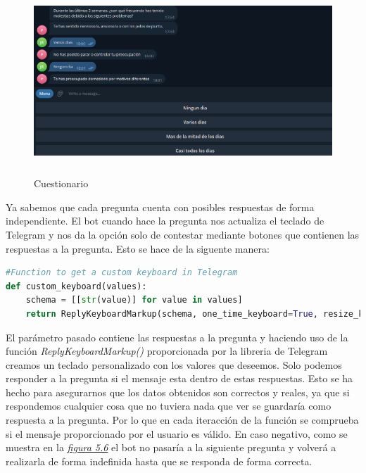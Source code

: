 \begin{figure}[!ht]
    \centering
    \includegraphics[width=1\textwidth, height=7cm]{imagenes/question.png}
    \caption{ Cuestionario }
    \label{fig:cuestionario}
\end{figure}

Ya sabemos que cada pregunta cuenta con posibles respuestas de forma independiente. El bot cuando hace la pregunta nos actualiza el teclado de Telegram y nos da la opción solo de contestar mediante botones que contienen las respuestas a la pregunta. Esto se hace de la siguente manera:

\begin{lstlisting}[language=Python]
#Function to get a custom keyboard in Telegram
def custom_keyboard(values):
    schema = [[str(value)] for value in values]
    return ReplyKeyboardMarkup(schema, one_time_keyboard=True, resize_keyboard=True)
\end{lstlisting}

El parámetro pasado contiene las respuestas a la pregunta y haciendo uso de la función \textit{ReplyKeyboardMarkup()} proporcionada por la libreria de Telegram creamos un teclado personalizado con los valores que deseemos. Solo podemos responder a la pregunta si el mensaje esta dentro de estas respuestas. Esto se ha hecho para asegurarnos que los datos obtenidos son correctos y reales, ya que si respondemos cualquier cosa que no tuviera nada que ver se guardaría como respuesta a la pregunta. Por lo que en cada iteracción de la función se comprueba si el mensaje proporcionado por el usuario es válido. En caso negativo, como se muestra en la \textit{\hyperref[fig:wrong]{figura 5.6}} el bot no pasaría a la siguiente pregunta y volverá a realizarla de forma indefinida hasta que se responda de forma correcta. \vspace{0.3cm}

